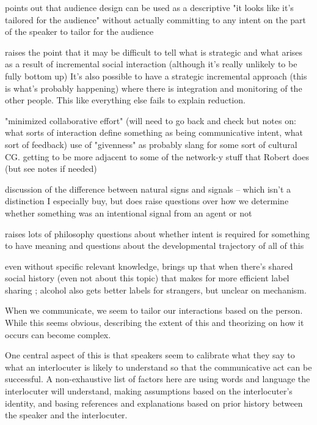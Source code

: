 \documentclass[]{article}
\begin{document}
\cite{rogers2013} points out that audience design can be used as a descriptive "it looks like it's tailored for the audience" without actually committing to any intent on the part of the speaker to tailor for the audience 

\cite{rogers2013} raises the point that it may be difficult to tell what is strategic and what arises as a result of incremental social interaction (although it's really unlikely to be fully bottom up) It's also possible to have a strategic incremental approach (this is what's probably happening) where there is integration and monitoring of the other people. This like everything else fails to explain reduction. 

\cite{fay2010} "minimized collaborative effort" (will need to go back and check but notes on: what sorts of interaction define something as being communicative intent, what sort of feedback) use of "givenness" as probably slang for some sort of cultural CG. getting to be more adjacent to some of the network-y stuff that Robert does (but see notes if needed) 


\cite{clark1996}
discussion of the difference between natural signs and signals -- which isn't a distinction I especially buy, but does raise questions over how we determine whether something was an intentional signal from an agent or not 

raises lots of philosophy questions about whether intent is required for something to have meaning and questions about the developmental trajectory of all of this 

even without specific relevant knowledge, \cite{garrison2022} brings up that when there's shared social history (even not about this topic) that makes for more efficient label sharing ; alcohol also gets better labels for strangers, but unclear on mechanism. 


When we communicate, we seem to tailor our interactions based on the person. While this seems obvious, describing the extent of this and theorizing on how it occurs can become complex. 

One central aspect of this is that speakers seem to calibrate what they say to what an interlocuter is likely to understand so that the communicative act can be successful. A non-exhaustive list of factors here are using words and language the interlocuter will understand, making assumptions based on the interlocuter's identity, and basing references and explanations based on prior history between the speaker and the interlocuter. 
\end{document}
